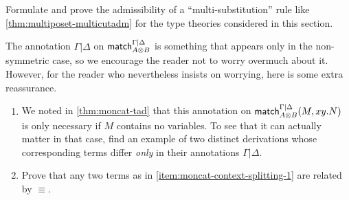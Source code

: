 \begin{ex}\label{ex:moncat-multisubadm}
  Formulate and prove the admissibility of a ``multi-substitution'' rule like \cref{thm:multiposet-multicutadm} for the type theories considered in this section.
\end{ex}

\begin{ex}\label{ex:moncat-context-splitting}
  The annotation $\Gamma|\Delta$ on $\mathsf{match}_{A\otimes B}^{\Gamma|\Delta}$ is something that appears only in the non-symmetric case, so we encourage the reader not to worry overmuch about it.
  However, for the reader who nevertheless insists on worrying, here is some extra reassurance.
  \begin{enumerate}
  \item We noted in \cref{thm:moncat-tad} that this annotation on $\mathsf{match}_{A\otimes B}^{\Gamma|\Delta}(M,xy.N)$ is only necessary if $M$ contains no variables.
    To see that it can actually matter in that case, find an example of two distinct derivations whose corresponding terms differ \emph{only} in their annotations $\Gamma|\Delta$.\label{item:moncat-context-splitting-1}
  \item Prove that any two terms as in \ref{item:moncat-context-splitting-1} are related by $\equiv$.
  \end{enumerate}
\end{ex}

